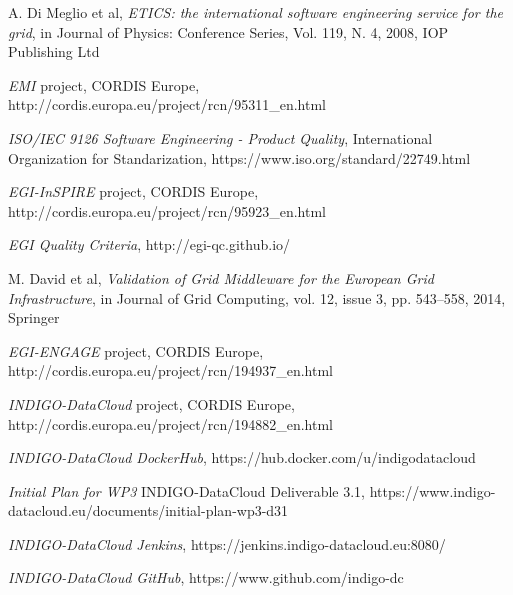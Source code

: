 \documentclass[journal]{IEEEtran}
\begin{document}
\begin{thebibliography}{1}
A. Di Meglio et al, \emph{ETICS: the international software engineering service for the grid}, in Journal of Physics: Conference Series, Vol. 119, N. 4, 2008, IOP Publishing Ltd

\emph{EMI} project, CORDIS Europe, http://cordis.europa.eu/project/rcn/95311\_en.html

\emph{ISO/IEC 9126 Software Engineering - Product Quality}, International Organization for Standarization, https://www.iso.org/standard/22749.html

\emph{EGI-InSPIRE} project, CORDIS Europe, http://cordis.europa.eu/project/rcn/95923\_en.html

\emph{EGI Quality Criteria}, http://egi-qc.github.io/

M. David et al, \emph{Validation of Grid Middleware for the European Grid Infrastructure}, in Journal of Grid Computing, vol. 12, issue 3, pp. 543–558, 2014, Springer

\emph{EGI-ENGAGE} project, CORDIS Europe, http://cordis.europa.eu/project/rcn/194937\_en.html

\emph{INDIGO-DataCloud} project, CORDIS Europe, http://cordis.europa.eu/project/rcn/194882\_en.html

\emph{INDIGO-DataCloud DockerHub}, https://hub.docker.com/u/indigodatacloud

\emph{Initial Plan for WP3} INDIGO-DataCloud Deliverable 3.1, https://www.indigo-datacloud.eu/documents/initial-plan-wp3-d31

\emph{INDIGO-DataCloud Jenkins}, https://jenkins.indigo-datacloud.eu:8080/

\emph{INDIGO-DataCloud GitHub}, https://www.github.com/indigo-dc

\end{thebibliography}



\end{document}
